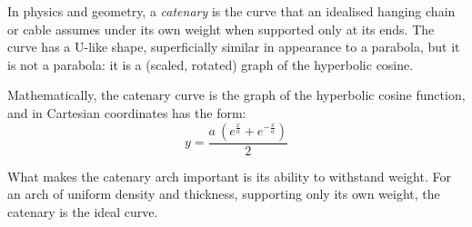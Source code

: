\documentclass[11pt]{amsart}
\begin{document}
In physics and geometry, a \textit{catenary} is the curve that an idealised hanging chain or cable assumes under its own weight when supported only at its ends. The curve has a U-like shape, superficially similar in appearance to a parabola, but it is not a parabola: it is a (scaled, rotated) graph of the hyperbolic cosine. 

Mathematically, the catenary curve is the graph of the hyperbolic cosine function, and in Cartesian coordinates has the form:
\begin{equation}
y = \frac{a \: (e^{\frac{x}{a}} + e^{-\frac{x}{a}})}{2}
\end{equation}

What makes the catenary arch important is its ability to withstand weight. For an arch of uniform density and thickness, supporting only its own weight, the catenary is the ideal curve.
\end{document}

